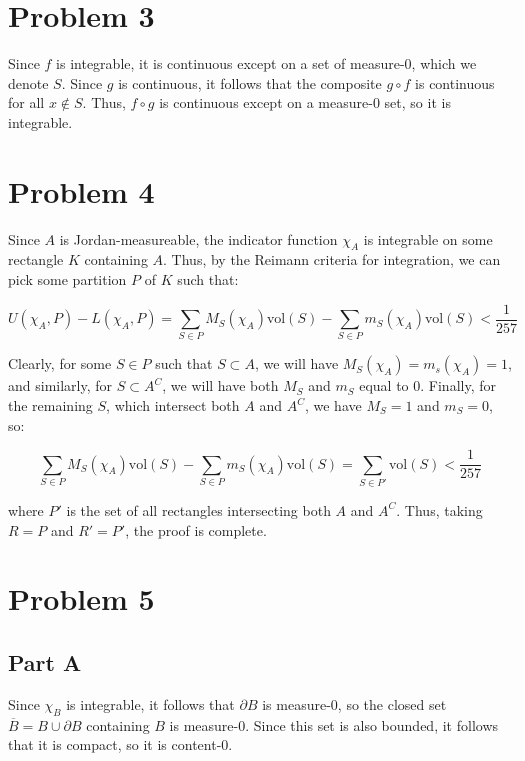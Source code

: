 \documentclass[10pt, oneside]{amsart}
\begin{document}
    \section{Problem 3}

    Since $f$ is integrable, it is continuous except on a set of measure-$0$, which we denote $S$. Since $g$ is continuous, it follows that the composite $g \circ f$ is continuous for all $x \notin S$. Thus,
    $f \circ g$ is continuous except on a measure-$0$ set, so it is integrable.

    \hrulefill

    \section{Problem 4}

    Since $A$ is Jordan-measureable, the indicator function $\chi_A$ is integrable on some rectangle $K$ containing $A$. Thus, by the Reimann criteria for integration, we can pick some partition $P$ of $K$ such that:

    $$U(\chi_A, P) - L(\chi_A, P) = \displaystyle\sum_{S \in P} M_S(\chi_A) \text{vol}(S) - \displaystyle\sum_{S \in P} m_S(\chi_A) \text{vol}(S) < \frac{1}{257}$$

    Clearly, for some $S \in P$ such that $S \subset A$, we will have $M_S(\chi_A) = m_s(\chi_A) = 1$, and similarly, for $S \subset A^C$, we will have both $M_S$ and $m_S$ equal to $0$. Finally,
    for the remaining $S$, which intersect both $A$ and $A^C$, we have $M_S = 1$ and $m_S = 0$, so:

    $$\displaystyle\sum_{S \in P} M_S(\chi_A) \text{vol}(S) - \displaystyle\sum_{S \in P} m_S(\chi_A) \text{vol}(S) = \displaystyle\sum_{S \in P'} \text{vol}(S) < \frac{1}{257}$$

    where $P'$ is the set of all rectangles intersecting both $A$ and $A^C$. Thus, taking $R = P$ and $R' = P'$, the proof is complete.

    \hrulefill

    \section{Problem 5}

    \subsection{Part A} Since $\chi_B$ is integrable, it follows that $\partial B$ is measure-$0$, so the closed set $\overline{B} = B \cup \partial B$ containing $B$ is measure-$0$. Since this set is also
    bounded, it follows that it is compact, so it is content-$0$.
    \newline
\end{document}
